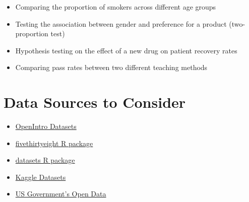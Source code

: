 \documentclass[12pt]{article}
\begin{document}
\begin{itemize}
    \item Comparing the proportion of smokers across different age groups  
    \item Testing the association between gender and preference for a product (two-proportion test)  
    \item Hypothesis testing on the effect of a new drug on patient recovery rates  
    \item Comparing pass rates between two different teaching methods  
\end{itemize}

\section*{Data Sources to Consider}

\begin{itemize}
    \item \href{https://www.openintro.org/data/}{OpenIntro Datasets}  
    \item \href{https://cran.r-project.org/web/packages/fivethirtyeight/vignettes/fivethirtyeight.html}{fivethirtyeight R package}  
    \item \href{https://stat.ethz.ch/R-manual/R-devel/library/datasets/html/00Index.html}{datasets R package}  
    \item \href{https://www.kaggle.com/datasets}{Kaggle Datasets}  
    \item \href{https://data.gov/}{US Government’s Open Data}  
\end{itemize}
\end{document}
